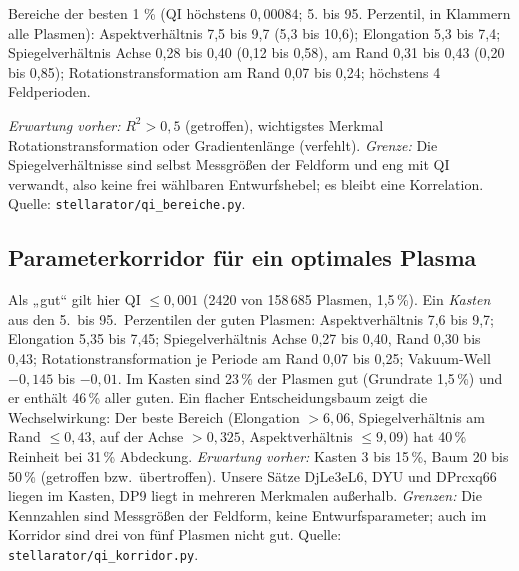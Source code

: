 Bereiche der besten 1 \% (QI höchstens $0{,}00084$; 5. bis 95. Perzentil, in Klammern alle Plasmen):
Aspektverhältnis 7,5 bis 9,7 (5,3 bis 10,6); Elongation 5,3 bis 7,4; Spiegelverhältnis Achse 0,28 bis 0,40 (0,12 bis 0,58),
am Rand 0,31 bis 0,43 (0,20 bis 0,85); Rotationstransformation am Rand 0,07 bis 0,24; höchstens 4 Feldperioden.

\emph{Erwartung vorher:} $R^2>0{,}5$ (getroffen), wichtigstes Merkmal Rotationstransformation oder Gradientenlänge
(verfehlt). \emph{Grenze:} Die Spiegelverhältnisse sind selbst Messgrößen der Feldform und eng mit QI verwandt, also
keine frei wählbaren Entwurfshebel; es bleibt eine Korrelation. Quelle: \texttt{stellarator/qi\_bereiche.py}.

\subsection*{Parameterkorridor für ein optimales Plasma}
Als „gut“ gilt hier QI $\le 0{,}001$ (2420 von 158\,685 Plasmen, 1,5\,\%). Ein \emph{Kasten} aus den 5.\ bis 95.\ Perzentilen der guten Plasmen:
Aspektverhältnis 7,6 bis 9,7; Elongation 5,35 bis 7,45; Spiegelverhältnis Achse 0,27 bis 0,40, Rand 0,30 bis 0,43; Rotationstransformation je Periode
am Rand 0,07 bis 0,25; Vakuum-Well $-0{,}145$ bis $-0{,}01$. Im Kasten sind 23\,\% der Plasmen gut (Grundrate 1,5\,\%) und er enthält 46\,\% aller guten.
Ein flacher Entscheidungsbaum zeigt die Wechselwirkung: Der beste Bereich (Elongation $>6{,}06$, Spiegelverhältnis am Rand $\le0{,}43$, auf der Achse $>0{,}325$,
Aspektverhältnis $\le9{,}09$) hat 40\,\% Reinheit bei 31\,\% Abdeckung. \emph{Erwartung vorher:} Kasten 3 bis 15\,\%, Baum 20 bis 50\,\% (getroffen bzw.\ übertroffen).
Unsere Sätze DjLe3eL6, DYU und DPrcxq66 liegen im Kasten, DP9 liegt in mehreren Merkmalen außerhalb.
\emph{Grenzen:} Die Kennzahlen sind Messgrößen der Feldform, keine Entwurfsparameter; auch im Korridor sind drei von fünf Plasmen nicht gut. Quelle: \texttt{stellarator/qi\_korridor.py}.

